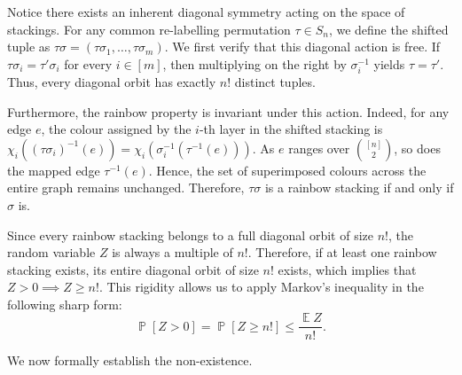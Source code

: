 \documentclass[11pt,reqno]{amsart}
\theoremstyle{definition}
\theoremstyle{remark}
\newcommand\E{\operatorname{\mathbb{E}}}
\renewcommand\Pr{\operatorname{\mathbb{P}}}
\renewcommand\le{\leqslant}
\renewcommand\ge{\geqslant}
\begin{document}
Notice there exists an inherent diagonal symmetry acting on the space of stackings. For any common re-labelling permutation $\tau \in S_n$, we define the shifted tuple as $\tau\sigma = (\tau\sigma_1, \dots, \tau\sigma_m)$. We first verify that this diagonal action is free. If $\tau\sigma_i = \tau'\sigma_i$ for every $i \in [m]$, then multiplying on the right by $\sigma_i^{-1}$ yields $\tau = \tau'$. Thus, every diagonal orbit has exactly $n!$ distinct tuples.

Furthermore, the rainbow property is invariant under this action. Indeed, for any edge $e$, the colour assigned by the $i$-th layer in the shifted stacking is $\chi_i((\tau\sigma_i)^{-1}(e)) = \chi_i(\sigma_i^{-1}(\tau^{-1}(e))).$
As $e$ ranges over $\binom{[n]}{2}$, so does the mapped edge $\tau^{-1}(e)$. Hence, the set of superimposed colours across the entire graph remains unchanged. Therefore, $\tau\sigma$ is a rainbow stacking if and only if $\sigma$ is.

Since every rainbow stacking belongs to a full diagonal orbit of size $n!$, the random variable $Z$ is always a multiple of $n!$. Therefore, if at least one rainbow stacking exists, its entire diagonal orbit of size $n!$ exists, which implies that $Z > 0 \implies Z \ge n!$. This rigidity allows us to apply Markov's inequality in the following sharp form:
\begin{equation} \label{eq:markov_sharp}
\Pr[Z > 0] = \Pr[Z \ge n!] \le \frac{\E Z}{n!}.
\end{equation}

We now formally establish the non-existence.
\end{document}
